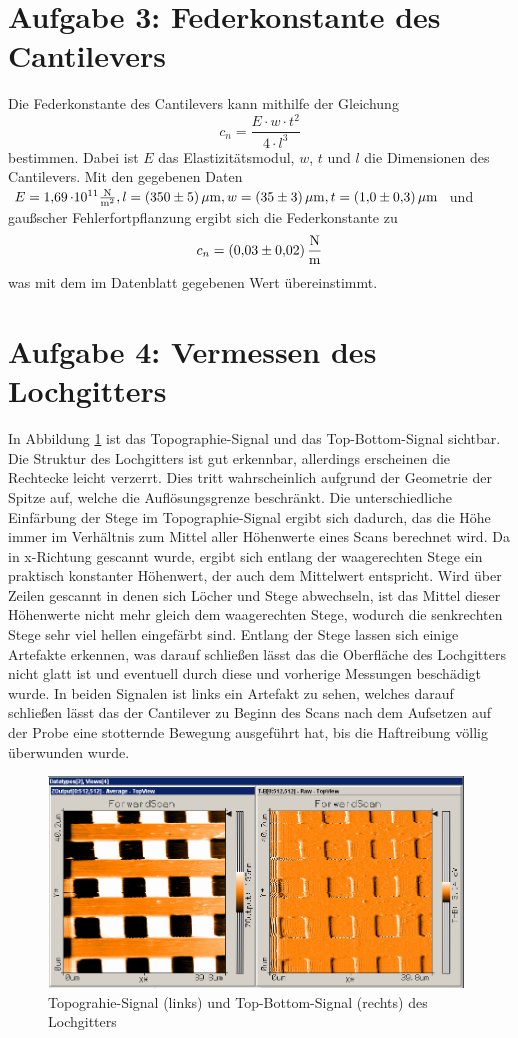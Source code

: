 \section{Aufgabe 3: Federkonstante des Cantilevers}
Die Federkonstante des Cantilevers kann mithilfe der Gleichung $$c_n = \frac{E\cdot w\cdot t^2}{4 \cdot l^3}$$ bestimmen. Dabei ist $E$ das Elastizitätsmodul, $w$, $t$ und $l$ die Dimensionen des Cantilevers. 
Mit den gegebenen Daten $E = \SI{1,69 }{\cdot 10^{11}\frac{N}{m^2}}, l = \SI{350 \pm 5}{\mu m}, w = \SI{35 \pm 3}{\mu m}, t = \SI{1 \pm 0.3}{\mu m}$ und gaußscher Fehlerfortpflanzung ergibt sich die Federkonstante zu
$$c_n = \SI{0,03 \pm 0,02}{\frac{N}{m}}$$
was mit dem im Datenblatt gegebenen Wert übereinstimmt. 

\section{Aufgabe 4: Vermessen des Lochgitters}
\label{chapter:Aufgabe4}
In Abbildung \ref{fig:lochgitter} ist das Topographie-Signal und das Top-Bottom-Signal sichtbar. Die Struktur des Lochgitters ist gut erkennbar, allerdings erscheinen die Rechtecke leicht verzerrt. Dies tritt wahrscheinlich aufgrund der Geometrie der Spitze auf, welche die Auflösungsgrenze beschränkt. Die unterschiedliche Einfärbung der Stege im Topographie-Signal ergibt sich dadurch, das die Höhe immer im Verhältnis zum Mittel aller Höhenwerte eines Scans berechnet wird. Da in x-Richtung gescannt wurde, ergibt sich entlang der waagerechten Stege ein praktisch konstanter Höhenwert, der auch dem Mittelwert entspricht. Wird über Zeilen gescannt in denen sich Löcher und Stege abwechseln, ist das Mittel dieser Höhenwerte nicht mehr gleich dem waagerechten Stege, wodurch die senkrechten Stege sehr viel hellen eingefärbt sind. Entlang der Stege lassen sich einige Artefakte erkennen, was darauf schließen lässt das die Oberfläche des Lochgitters nicht glatt ist und eventuell durch diese und vorherige Messungen beschädigt wurde. In beiden Signalen ist links ein Artefakt zu sehen, welches darauf schließen lässt das der Cantilever zu Beginn des Scans nach dem Aufsetzen auf der Probe eine stotternde Bewegung ausgeführt hat, bis die Haftreibung völlig überwunden wurde.\\
\begin{figure}[t]
    \centering
    \includegraphics[width=110mm,scale=0.5]{Rasterkraftmikroskop/Daten/A4.png}
    \caption{Topograhie-Signal (links) und Top-Bottom-Signal (rechts) des Lochgitters} 
    \label{fig:lochgitter}
\end{figure}
